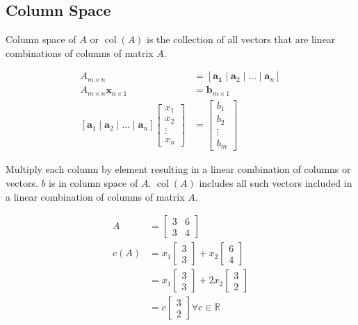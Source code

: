 \documentclass[main.tex]{subfiles}
\begin{document}
\subsection{Column Space}

Column space of $A$ or $\operatorname{col}(A)$ is the collection of all vectors that are linear combinations of columns of matrix $A$.

$$
\begin{aligned}
A_{m \times n} &= \left[\bm{a_{1}} \mid \bm{a}_{2} \mid \ldots \mid \bm{a}_{n}\right]\\
A_{m \times n} \bm{x}_{n \times 1} &= \bm{b}_{m \times 1}\\
\left[\bm{a}_1 \mid \bm{a}_2 \mid \ldots \mid \bm{a}_n \right]
\left[\begin{array}{c}
x_{1} \\
x_{2} \\
\vdots \\
x_{n}
\end{array}\right]&=\left[\begin{array}{c}
b_{1} \\
b_{2} \\
\vdots \\
b_{m}
\end{array}\right]
\end{aligned}
$$

Multiply each column by element resulting in a linear combination of columns or vectors. $b$ is in column space of $A$. $\operatorname{col}(A)$ includes all such vectors included in a linear combination of columns of matrix $A$.

$$
\begin{aligned}
A &= \left[\begin{array}{lll}
3 & 6 \\
3 & 4
\end{array}\right]\\
c(A) &= x_{1}\left[\begin{array}{l}
3 \\
3
\end{array}\right]+x_{2}\left[\begin{array}{l}
6 \\
4
\end{array}\right]\\
& = x_{1}\left[\begin{array}{l}
3 \\
3
\end{array}\right]+2 x_{2}\left[\begin{array}{l}
3 \\
2
\end{array}\right]\\
&=c\left[\begin{array}{l}
3 \\
2
\end{array}\right] \forall c \in \mathbb{R}
\end{aligned}
$$
\end{document}
